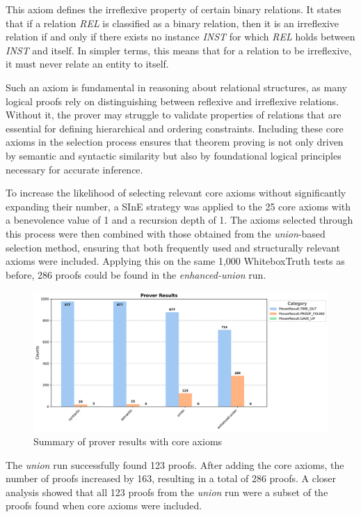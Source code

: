 \documentclass[english,version-2020-11]{uzl-thesis}
\begin{document}
This axiom defines the irreflexive property of certain binary relations. It states that if a relation \textit{REL} is classified as a binary relation, then it is an irreflexive relation if and only if there exists no instance \textit{INST} for which \textit{REL} holds between \textit{INST} and itself. In simpler terms, this means that for a relation to be irreflexive, it must never relate an entity to itself.

Such an axiom is fundamental in reasoning about relational structures, as many logical proofs rely on distinguishing between reflexive and irreflexive relations. Without it, the prover may struggle to validate properties of relations that are essential for defining hierarchical and ordering constraints. Including these core axioms in the selection process ensures that theorem proving is not only driven by semantic and syntactic similarity but also by foundational logical principles necessary for accurate inference.

To increase the likelihood of selecting relevant core axioms without significantly expanding their number, a SInE strategy was applied to the 25 core axioms with a benevolence value of 1 and a recursion depth of 1. The axioms selected through this process were then combined with those obtained from the \textit{union}-based selection method, ensuring that both frequently used and structurally relevant axioms were included. Applying this on the same 1,000 WhiteboxTruth tests as before, 286 proofs could be found in the \textit{enhanced-union} run.

\begin{figure}[h!]
    \centering
    \includegraphics[width=\textwidth]{standard_mode_output.pdf}
    \caption{Summary of prover results with core axioms}
    \label{fig:prover_results_with_core_axioms}
\end{figure}
\FloatBarrier

The \textit{union} run successfully found 123 proofs. After adding the core axioms, the number of proofs increased by 163, resulting in a total of 286 proofs. A closer analysis showed that all 123 proofs from the \textit{union} run were a subset of the proofs found when core axioms were included. 
\end{document}
